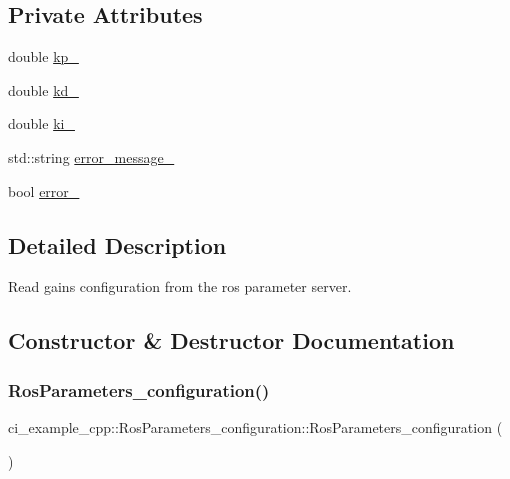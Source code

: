 \subsection*{Private Attributes}
\begin{DoxyCompactItemize}
\item 
double \hyperlink{classci__example__cpp_1_1RosParameters__configuration_a4b8d047f6493863c6878df5209331761}{kp\+\_\+}
\item 
double \hyperlink{classci__example__cpp_1_1RosParameters__configuration_a51b4e5cc8e72a0ab808bf71cee50d16c}{kd\+\_\+}
\item 
double \hyperlink{classci__example__cpp_1_1RosParameters__configuration_a777808b0fd55a891351ca0054773c374}{ki\+\_\+}
\item 
std\+::string \hyperlink{classci__example__cpp_1_1RosParameters__configuration_ab0f1e9eb6d5bf3bd9fca4940961ba678}{error\+\_\+message\+\_\+}
\item 
bool \hyperlink{classci__example__cpp_1_1RosParameters__configuration_a77545cc772174c2a4c321396081222de}{error\+\_\+}
\end{DoxyCompactItemize}


\subsection{Detailed Description}
Read gains configuration from the ros parameter server. 

\subsection{Constructor \& Destructor Documentation}
\mbox{\label{classci__example__cpp_1_1RosParameters__configuration_aca978c1389d0f672f9cf2e9a68b131c3}} 
\subsubsection{\texorpdfstring{Ros\+Parameters\+\_\+configuration()}{RosParameters\_configuration()}}
{\footnotesize\ttfamily ci\+\_\+example\+\_\+cpp\+::\+Ros\+Parameters\+\_\+configuration\+::\+Ros\+Parameters\+\_\+configuration (\begin{DoxyParamCaption}{ }\end{DoxyParamCaption})}



